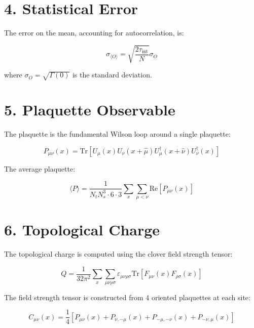 \documentclass[12pt,a4paper]{article}
\begin{document}
\section*{4. Statistical Error}

The error on the mean, accounting for autocorrelation, is:

\begin{equation}
\sigma_{\langle O \rangle} = \sqrt{\frac{2\tau_{\text{int}}}{N}} \sigma_O
\end{equation}

where $\sigma_O = \sqrt{\Gamma(0)}$ is the standard deviation.

\section*{5. Plaquette Observable}

The plaquette is the fundamental Wilson loop around a single plaquette:

\begin{equation}
P_{\mu\nu}(x) = \text{Tr}\left[ U_{\mu}(x) U_{\nu}(x+\hat{\mu}) U_{\mu}^{\dagger}(x+\hat{\nu}) U_{\nu}^{\dagger}(x) \right]
\end{equation}

The average plaquette:

\begin{equation}
\langle P \rangle = \frac{1}{N_t N_s^3 \cdot 6\cdot 3} \sum_{x} \sum_{\mu<\nu} \text{Re}\left[ P_{\mu\nu}(x) \right]
\end{equation}

\section*{6. Topological Charge}

The topological charge is computed using the clover field strength tensor:

\begin{equation}
Q = \frac{1}{32\pi^2} \sum_x \sum_{\mu\nu\rho\sigma} 
\varepsilon_{\mu\nu\rho\sigma} \text{Tr}\left[ F_{\mu\nu}(x) F_{\rho\sigma}(x) \right]
\end{equation}

The field strength tensor is constructed from 4 oriented plaquettes at each site:

\begin{equation}
C_{\mu\nu}(x) = \frac{1}{4} \left[ P_{\mu\nu}(x) + P_{\nu,-\mu}(x) + P_{-\mu,-\nu}(x) + P_{-\nu,\mu}(x) \right]
\end{equation}
\end{document}
